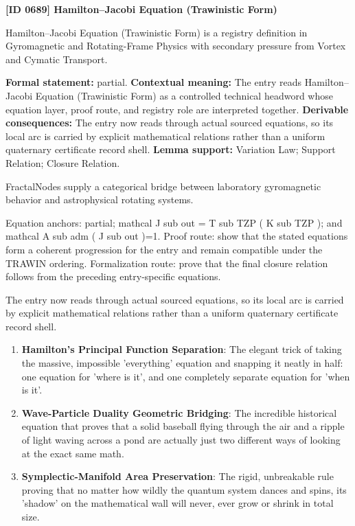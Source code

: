 \clearpage
\noindent\textbf{[ID 0689] Hamilton--Jacobi Equation (Trawinistic Form)}\par
\vspace{0.35em}
\begingroup\small
{}
Hamilton--Jacobi Equation (Trawinistic Form) is a registry definition in Gyromagnetic and Rotating-Frame Physics with secondary pressure from Vortex and Cymatic Transport.

\begingroup\footnotesize\setlength{\emergencystretch}{3em}\sloppy
\textbf{Formal statement:} partial. \textbf{Contextual meaning:} The entry reads Hamilton--Jacobi Equation (Trawinistic Form) as a controlled technical headword whose equation layer, proof route, and registry role are interpreted together. \textbf{Derivable consequences:} The entry now reads through actual sourced equations, so its local arc is carried by explicit mathematical relations rather than a uniform quaternary certificate record shell. \textbf{Lemma support:} Variation Law; Support Relation; Closure Relation.\par
\endgroup

FractalNodes supply a categorical bridge between laboratory gyromagnetic behavior and astrophysical rotating systems.

Equation anchors: partial; mathcal J sub out = T sub TZP ( K sub TZP ); and mathcal A sub adm ( J sub out )=1. Proof route: show that the stated equations form a coherent progression for the entry and remain compatible under the TRAWIN ordering. Formalization route: prove that the final closure relation follows from the preceding entry-specific equations.

The entry now reads through actual sourced equations, so its local arc is carried by explicit mathematical relations rather than a uniform quaternary certificate record shell.
\endgroup

\begin{enumerate}[leftmargin=1.6em,itemsep=6pt,topsep=4pt]
\item \textbf{Hamilton's Principal Function Separation}: The elegant trick of taking the massive, impossible 'everything' equation and snapping it neatly in half: one equation for 'where is it', and one completely separate equation for 'when is it'.
\item \textbf{Wave-Particle Duality Geometric Bridging}: The incredible historical equation that proves that a solid baseball flying through the air and a ripple of light waving across a pond are actually just two different ways of looking at the exact same math.
\item \textbf{Symplectic-Manifold Area Preservation}: The rigid, unbreakable rule proving that no matter how wildly the quantum system dances and spins, its 'shadow' on the mathematical wall will never, ever grow or shrink in total size.
\end{enumerate}

